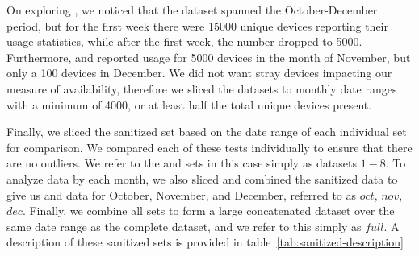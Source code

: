 On exploring , we noticed that the dataset spanned the October-December period, but for the first week there were 15000 unique devices reporting their usage statistics, while after the first week, the number dropped to 5000. Furthermore,  and  reported usage for 5000 devices in the month of November, but only a 100 devices in December. We did not want stray devices impacting our measure of availability, therefore we sliced the \control datasets to monthly date ranges with a minimum of 4000, or at least half the total unique devices present.

Finally, we sliced the sanitized \test set based on the date range of each individual \control set for comparison. We compared each of these tests individually to ensure that there are no outliers. We refer to the \test and \control sets in this case simply as datasets $1-8$. To analyze data by each month, we also sliced and combined the sanitized data to give us \control and \test data for October, November, and December, referred to as $oct$, $nov$, $dec$. Finally, we combine all \control sets to form a large concatenated dataset over the same date range as the complete \test dataset, and we refer to this simply as $full$. A description of these sanitized sets is provided in table~\ref{tab:sanitized-description} 

